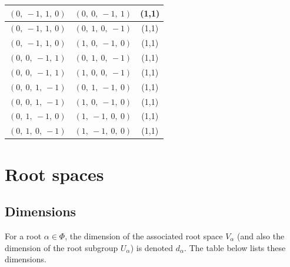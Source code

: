 \documentclass[11pt]{article}
\theoremstyle{definition}
\begin{document}
\begin{longtable}{|l|l|c|}
    \hline
    $\left( 0, \  -1, \  1, \  0\right)$ & $\left( 0, \  0, \  -1, \  1\right)$ & (1,1) \\
    \hline
    $\left( 0, \  -1, \  1, \  0\right)$ & $\left( 0, \  1, \  0, \  -1\right)$ & (1,1) \\
    \hline
    $\left( 0, \  -1, \  1, \  0\right)$ & $\left( 1, \  0, \  -1, \  0\right)$ & (1,1) \\
    \hline
    $\left( 0, \  0, \  -1, \  1\right)$ & $\left( 0, \  1, \  0, \  -1\right)$ & (1,1) \\
    \hline
    $\left( 0, \  0, \  -1, \  1\right)$ & $\left( 1, \  0, \  0, \  -1\right)$ & (1,1) \\
    \hline
    $\left( 0, \  0, \  1, \  -1\right)$ & $\left( 0, \  1, \  -1, \  0\right)$ & (1,1) \\
    \hline
    $\left( 0, \  0, \  1, \  -1\right)$ & $\left( 1, \  0, \  -1, \  0\right)$ & (1,1) \\
    \hline
    $\left( 0, \  1, \  -1, \  0\right)$ & $\left( 1, \  -1, \  0, \  0\right)$ & (1,1) \\
    \hline
    $\left( 0, \  1, \  0, \  -1\right)$ & $\left( 1, \  -1, \  0, \  0\right)$ & (1,1) \\
    \hline
\end{longtable}

\fi

\newpage
\section{Root spaces}

\subsection{Dimensions}

For a root $\alpha \in \Phi$, the dimension of the associated root space $V_\alpha$ (and also the dimension of the root subgroup $U_\alpha$) is denoted $d_\alpha$. The table below lists these dimensions.

\bigskip
\end{document}

